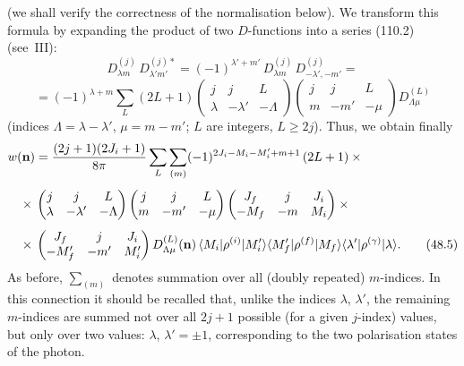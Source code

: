 (we shall verify the correctness of the normalisation below). We transform this formula by expanding the product of two $D$-functions into a series (110.2) (see~III):
\[
D^{(j)}_{\lambda m}\,D^{(j)*}_{\lambda'm'} = (-1)^{\lambda'+m'}\,D^{(j)}_{\lambda m}\,D^{(j)}_{-\lambda',-m'} =
\]
\begin{equation}
= (-1)^{\lambda+m}\sum_L(2L+1)\begin{pmatrix} j & j & L \\ \lambda & -\lambda' & -\Lambda\end{pmatrix}\begin{pmatrix} j & j & L \\ m & -m' & -\mu\end{pmatrix}D^{(L)}_{\Lambda\mu}
\end{equation}
(indices $\Lambda = \lambda - \lambda'$, $\mu = m - m'$; $L$ are integers, $L \geqslant 2j$). Thus, we obtain finally
\begin{align}
w(\mathbf{n}) &= \frac{(2j+1)(2J_i+1)}{8\pi}\sum_L\sum_{(m)}(-1)^{2J_i - M_i - M'_i + m + 1}\,(2L+1)\times{}\notag\\[4pt]
{}\times{}&\begin{pmatrix} j & j & L \\ \lambda & -\lambda' & -\Lambda\end{pmatrix}\begin{pmatrix} j & j & L \\ m & -m' & -\mu\end{pmatrix}\begin{pmatrix} J_f & j & J_i \\ -M_f & -m & M_i\end{pmatrix}\times{}\notag\\[4pt]
{}\times{}&\begin{pmatrix} J_f & j & J_i \\ -M'_f & -m' & M'_i\end{pmatrix}D^{(L)}_{\Lambda\mu}(\mathbf{n})\,\langle M_i|\rho^{(i)}|M'_i\rangle\langle M'_f|\rho^{(f)}|M_f\rangle\langle\lambda'|\rho^{(\gamma)}|\lambda\rangle.
\tag{48.5}
\end{align}
As before, $\sum_{(m)}$ denotes summation over all (doubly repeated) $m$-indices. In this connection it should be recalled that, unlike the indices $\lambda$, $\lambda'$, the remaining $m$-indices are summed not over all $2j + 1$ possible (for a given $j$-index) values, but only over two values: $\lambda$, $\lambda' = \pm 1$, corresponding to the two polarisation states of the photon.

